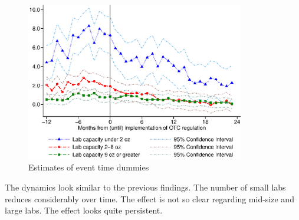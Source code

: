 \documentclass[%
  fontsize=11pt, %
  version=last,%
  headsepline,
  titlepage = false,
  DIV = 11, %
  abstract = false
]{scrartcl}
\begin{document}
\subsection{} %
\begin{figure}[th]
	\centering
	\caption{Estimates of event time dummies}	\label{fig:Figf}
	\includegraphics[width=0.85\textwidth]{Figure_exercise_f.eps}
\end{figure}

The dynamics look similar to the previous findings. The number of small labs reduces considerably over time. The effect is not so clear regarding mid-size and large labs. The effect looks quite persistent.


\end{document}
